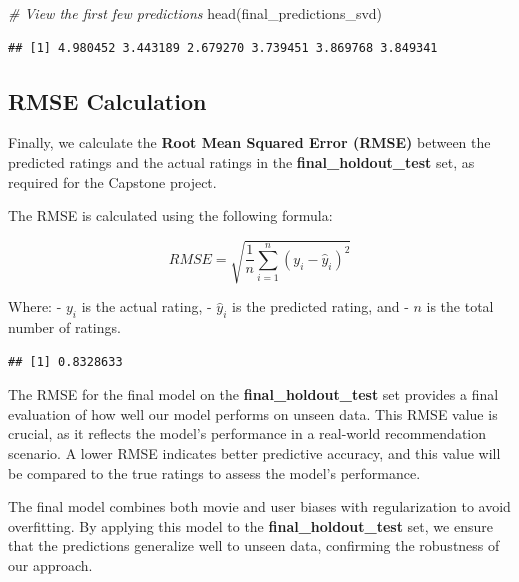 \documentclass[
]{article}
\newenvironment{Shaded}{}{}
\newcommand{\CommentTok}[1]{\textcolor[rgb]{0.38,0.63,0.69}{\textit{#1}}}
\newcommand{\FunctionTok}[1]{\textcolor[rgb]{0.02,0.16,0.49}{#1}}
\newcommand{\NormalTok}[1]{#1}
\newcommand{\OtherTok}[1]{\textcolor[rgb]{0.00,0.44,0.13}{#1}}
\newcommand{\SpecialCharTok}[1]{\textcolor[rgb]{0.25,0.44,0.63}{#1}}
\begin{document}
\begin{Shaded}
\begin{Highlighting}[]
\CommentTok{\# View the first few predictions}
\FunctionTok{head}\NormalTok{(final\_predictions\_svd)}
\end{Highlighting}
\end{Shaded}

\begin{verbatim}
## [1] 4.980452 3.443189 2.679270 3.739451 3.869768 3.849341
\end{verbatim}

\subsection{RMSE Calculation}\label{rmse-calculation}

Finally, we calculate the \textbf{Root Mean Squared Error (RMSE)}
between the predicted ratings and the actual ratings in the
\textbf{final\_holdout\_test} set, as required for the Capstone project.

The RMSE is calculated using the following formula:

\[
RMSE = \sqrt{\frac{1}{n} \sum_{i=1}^{n} (y_i - \hat{y}_i)^2}
\]

Where: - \(y_i\) is the actual rating, - \(\hat{y}_i\) is the predicted
rating, and - \(n\) is the total number of ratings.

\begin{Shaded}
\end{Shaded}

\begin{verbatim}
## [1] 0.8328633
\end{verbatim}

The RMSE for the final model on the \textbf{final\_holdout\_test} set
provides a final evaluation of how well our model performs on unseen
data. This RMSE value is crucial, as it reflects the model's performance
in a real-world recommendation scenario. A lower RMSE indicates better
predictive accuracy, and this value will be compared to the true ratings
to assess the model's performance.

The final model combines both movie and user biases with regularization
to avoid overfitting. By applying this model to the
\textbf{final\_holdout\_test} set, we ensure that the predictions
generalize well to unseen data, confirming the robustness of our
approach.
\end{document}

